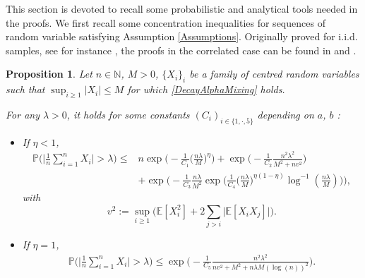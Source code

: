 \documentclass[11pt,a4paper,oneside]{amsart}
\numberwithin{equation}{section}
\newtheorem{proposition}[theorem]{Proposition}
\begin{document}
This section is devoted to recall some probabilistic and analytical tools needed in the proofs. %
%
%
%
%
%
%
%
%
We first recall some concentration inequalities for sequences of random variable satisfying Assumption \ref{Assumptions}. Originally proved for i.i.d. samples, see for instance \cite[Theorem 3.6 \& 3.7]{chung2006concentration}, the proofs in the correlated case can be found in \cite[Theorem 1]{merlevede2011bernstein} and \cite[Theorem 2]{merlevede2009bernstein}.
%
\begin{proposition}\label{BersteinCorrelated}
%
Let $n\in\mathbb{N}$, $M>0$, $\{X_i\}_{i}$ be a family of centred random variables such that $\sup_{i\geq 1}\vert X_i\vert\leq M$ for which \eqref{DecayAlphaMixing} holds.

%
\medskip
%

For any $\lambda>0$, it holds for some constants $(C_i)_{i\in\{1,\cdot,5\}}$ depending on $a$, $b$ :
%
\begin{itemize}
%
\item[(i)]If $\eta<1$,
%
\begin{align*}
\mathbb{P}\bigg(\Big\vert\frac{1}{n}\sum_{i=1}^n X_i\Big\vert>\lambda\bigg)\leq& n\exp\bigg(-\frac{1}{C_1}\Big(\frac{n\lambda}{M}\Big)^{\eta}\bigg)+\exp\bigg(-\frac{1}{C_2}\frac{n^2\lambda^2}{M^2+n v^2}\bigg)\\
&+\exp\bigg(-\frac{1}{C_3}\frac{n\lambda}{M^2}\exp\Big(\frac{1}{C_4}\Big(\frac{n\lambda}{M}\Big)^{\eta(1-\eta)}\log^{-1}(\tfrac{n\lambda}{M})\Big)\bigg),
\end{align*}
%
with
%
$$v^2:=\sup_{i\geq 1}\Big(\mathbb{E}[X^2_i]+2\sum_{j> i}\vert\mathbb{E}[X_iX_j]\vert\Big).$$
%
\item[(ii)]If $\eta=1$,
%
\begin{align*}
\mathbb{P}\bigg(\Big\vert\frac{1}{n}\sum_{i=1}^n X_i\Big\vert>\lambda\bigg)\leq \exp\bigg(-\frac{1}{C_5}\frac{n^2\lambda^2}{nv^2+M^2+n\lambda M(\log(n))^2}\Bigg).
\end{align*}
%
\end{itemize}
%
\end{proposition}
\end{document}
